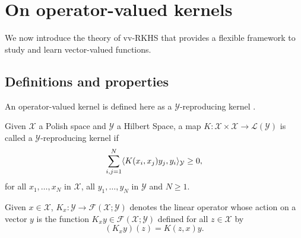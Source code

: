 \section{On operator-valued kernels}
\label{sec:background_on_operator-valued_kernels}
We now introduce the theory of \acf{vv-RKHS} that provides a flexible framework to study and learn vector-valued functions.
\subsection{Definitions and properties}
\label{subsec:def_properties}
An operator-valued kernel is defined here as a $\mathcal{Y}$-reproducing kernel \citet{Carmeli2010}.
\begin{definition}
Given $\mathcal{X}$ a Polish space and  $\mathcal{Y}$ a Hilbert Space, a map $K:\mathcal{X}\times\mathcal{X}\to\mathcal{L}(\mathcal{Y})$ is called a $\mathcal{Y}$-reproducing kernel if 
\begin{dmath*}
  \sum_{i,j=1}^N\inner{K(x_i,x_j)y_j,y_i}_{\mathcal{Y}}\ge 0,
\end{dmath*} 
for all $x_1,\hdots,x_N$ in $\mathcal{X}$, all $y_1,\hdots,y_N$ in $\mathcal{Y}$ and $N\ge1$.
 \label{def:ovk}
 \end{definition}
Given $x\in\mathcal{X}$, $K_x:\mathcal{Y}\to\mathcal{F}(\mathcal{X};\mathcal{Y})$ denotes the linear operator whose action on a vector $y$ is the function $K_xy\in\mathcal{F}(\mathcal{X};\mathcal{Y})$ defined for all $z\in\mathcal{X}$ by
\begin{dmath}
(K_x y)(z)=K(z,x)y.
\end{dmath}
